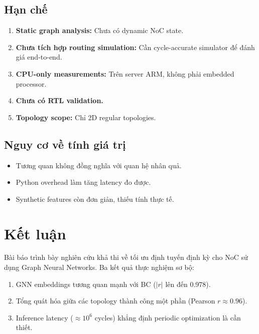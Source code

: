 \documentclass[conference]{IEEEtran}
\begin{document}
\subsection{Hạn chế}

\begin{enumerate}
    \item \textbf{Static graph analysis:} Chưa có dynamic NoC state.
    \item \textbf{Chưa tích hợp routing simulation:} Cần cycle-accurate
    simulator để đánh giá end-to-end.
    \item \textbf{CPU-only measurements:} Trên server ARM, không phải
    embedded processor.
    \item \textbf{Chưa có RTL validation.}
    \item \textbf{Topology scope:} Chỉ 2D regular topologies.
\end{enumerate}

\subsection{Nguy cơ về tính giá trị}

\begin{itemize}
    \item Tương quan không đồng nghĩa với quan hệ nhân quả.
    \item Python overhead làm tăng latency đo được.
    \item Synthetic features còn đơn giản, thiếu tính thực tế.
\end{itemize}

\section{Kết luận}
\label{sec:conclusion}

Bài báo trình bày nghiên cứu khả thi về tối ưu định tuyến định kỳ
cho NoC sử dụng Graph Neural Networks. Ba kết quả thực nghiệm sơ bộ:

\begin{enumerate}
    \item GNN embeddings tương quan mạnh với BC ($|r|$ lên đến 0.978).
    \item Tổng quát hóa giữa các topology thành công một phần
    (Pearson $r \approx 0.96$).
    \item Inference latency ($\approx 10^6$ cycles) khẳng định
    periodic optimization là cần thiết.
\end{enumerate}
\end{document}
